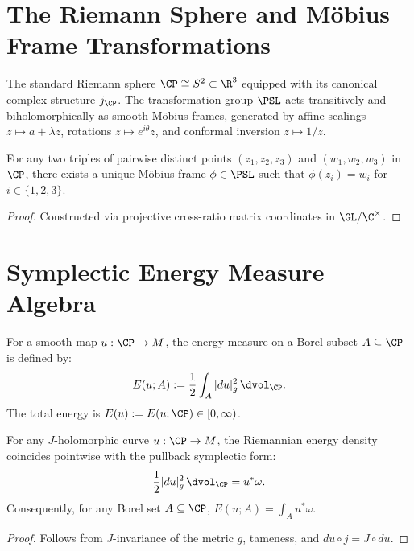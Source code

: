\section{The Riemann Sphere and Möbius Frame Transformations}

\begin{definition}
\label{f02:sphere_geometry}
\leanok
{}
The standard Riemann sphere $\CP \cong S^2 \subset \R^3$ equipped with its canonical complex structure $j_{\CP}$.
The transformation group $\PSL$ acts transitively and biholomorphically as smooth Möbius frames, generated by affine scalings $z \mapsto a + \lambda z$, rotations $z \mapsto e^{i\theta} z$, and conformal inversion $z \mapsto 1/z$.
\end{definition}

\begin{theorem}
\label{thm:three_point_transitivity}
\leanok
{}
For any two triples of pairwise distinct points $(z_1, z_2, z_3)$ and $(w_1, w_2, w_3)$ in $\CP$, there exists a unique Möbius frame $\phi \in \PSL$ such that $\phi(z_i) = w_i$ for $i \in \{1, 2, 3\}$.
\end{theorem}
\begin{proof}
\leanok
Constructed via projective cross-ratio matrix coordinates in $\GL / \C^\times$.
\end{proof}

\section{Symplectic Energy Measure Algebra}

\begin{definition}
\label{f03:energy_measure}
\leanok
{}
For a smooth map $u : \CP \to M$, the energy measure on a Borel subset $A \subseteq \CP$ is defined by:
\[
E(u; A) := \frac{1}{2} \int_A |du|_g^2 \, \dvol_{\CP}.
\]
The total energy is $E(u) := E(u; \CP) \in [0, \infty)$.
\end{definition}

\begin{theorem}
\label{thm:energy_eq_pullback_omega}
\leanok
{}
For any $J$-holomorphic curve $u : \CP \to M$, the Riemannian energy density coincides pointwise with the pullback symplectic form:
\[
\frac{1}{2} |du|_g^2 \, \dvol_{\CP} = u^* \omega.
\]
Consequently, for any Borel set $A \subseteq \CP$, $E(u; A) = \int_A u^* \omega$.
\end{theorem}
\begin{proof}
\leanok
Follows from $J$-invariance of the metric $g$, tameness, and $du \circ j = J \circ du$.
\end{proof}

